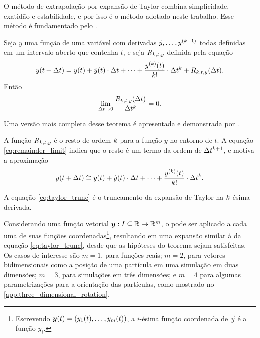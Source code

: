 O método de extrapolação por expansão de Taylor combina simplicidade, exatidão e estabilidade, e por isso é o método adotado neste trabalho. Esse método é fundamentado pelo .

\begin{theorem} \label{theo:taylor}
	Seja \(y\) uma função de uma variável com derivadas \(\deriv{1}{y},\dots,y^{\pqty{\taylorOrder+1}}\) todas definidas em um intervalo aberto que contenha \(t\), e seja \(R_{k,t,y}\) definida pela equação
    \begin{equation*}
    	y(t + \Dt) = y(t) + \deriv{1}{y}(t)\cdot\Dt + \dots + \dfrac{\deriv{\taylorOrder}{y}(t)}{\taylorOrder!}\cdot\Dt^\taylorOrder + \remainderFunction{\taylorOrder}{t}{y}(\Dt).
    \end{equation*}
    Então
    \begin{equation} \label{eq:remainder_limit}
    	\lim_{\Delta t \rightarrow 0} \dfrac{R_{k,t,y}(\Delta t)}{\Delta t^k} = 0.
    \end{equation}
\end{theorem}

Uma versão mais completa desse teorema é apresentada e demonstrada por .

A função \(R_{k,t,y}\) é o resto de ordem \(k\) para a função \(y\) no entorno de \(t\). A equação \eqref{eq:remainder_limit} indica que o resto é um termo da ordem de \(\Delta t^{k+1}\), e motiva a aproximação
\begin{equation} \label{eq:taylor_trunc}
    y(t + \Dt) \approximately y(t) + \deriv{1}{y}(t)\cdot\Dt + \dots + \dfrac{\deriv{\taylorOrder}{y}(t)}{\taylorOrder!}\cdot\Dt^\taylorOrder.
\end{equation}

A equação \eqref{eq:taylor_trunc} é o truncamento da expansão de Taylor na \(k\)-ésima derivada.

Considerando uma função vetorial \(\bm{y}:I\subseteq \mathbb{R} \rightarrow \mathbb{R}^m\), o  pode ser aplicado a cada uma de suas funções coordenadas\footnote{Escrevendo \(\vec{y}(t) = \pqty{y_1(t),\dots,y_m(t)}\), a \(i\)-ésima função coordenada de \(\vec{y}\) é a função \(y_i\).}, resultando em uma expansão similar à da equação \eqref{eq:taylor_trunc}, desde que as hipóteses do teorema sejam satisfeitas. Os casos de interesse são \(m=1\), para funções reais; \(m=2\), para vetores bidimensionais como a posição de uma partícula em uma simulação em duas dimensões; \(m=3\), para simulações em três dimensões; e \(m=4\) para algumas parametrizações para a orientação das partículas, como mostrado no \autoref{app:three_dimensional_rotation}.

